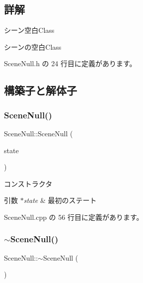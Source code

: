 \subsection{詳解}
シーン空白\+Class 

シーンの空白\+Class 

 Scene\+Null.\+h の 24 行目に定義があります。



\subsection{構築子と解体子}
\mbox{\label{class_scene_null_accf19999b93db3298bb702b3873fc4d5}} 
\subsubsection{\texorpdfstring{Scene\+Null()}{SceneNull()}}
{\footnotesize\ttfamily Scene\+Null\+::\+Scene\+Null (\begin{DoxyParamCaption}\item[{\mbox{\hyperlink{class_scene_base_1_1_state_base}{State\+Base}} $\ast$}]{state }\end{DoxyParamCaption})}



コンストラクタ 


\begin{DoxyParams}{引数}
{\em $\ast$state} & 最初のステート \\
\hline
\end{DoxyParams}


 Scene\+Null.\+cpp の 56 行目に定義があります。

\mbox{\label{class_scene_null_a89dec83bf96f843211e53907d0bb5df5}} 
\subsubsection{\texorpdfstring{$\sim$\+Scene\+Null()}{~SceneNull()}}
{\footnotesize\ttfamily Scene\+Null\+::$\sim$\+Scene\+Null (\begin{DoxyParamCaption}{ }\end{DoxyParamCaption})\hspace{0.3cm}{\ttfamily [virtual]}}



